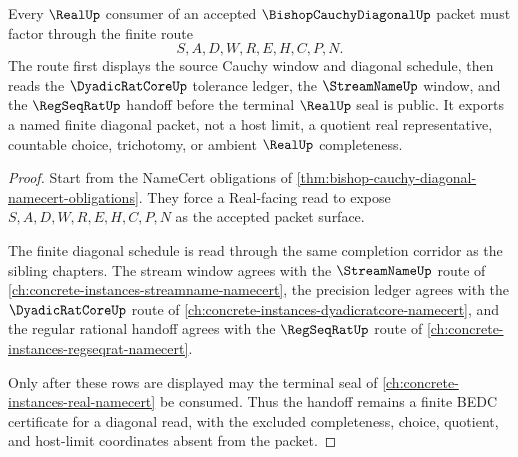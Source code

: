 \begin{theorem}
\label{thm:bishop-cauchy-diagonal-real-handoff}
Every $\RealUp$ consumer of an accepted $\BishopCauchyDiagonalUp$ packet must factor through the finite route
$$
S,A,D,W,R,E,H,C,P,N .
$$
The route first displays the source Cauchy window and diagonal schedule, then reads the $\DyadicRatCoreUp$ tolerance ledger, the $\StreamNameUp$ window, and the $\RegSeqRatUp$ handoff before the terminal $\RealUp$ seal is public. It exports a named finite diagonal packet, not a host limit, a quotient real representative, countable choice, trichotomy, or ambient $\RealUp$ completeness.
\end{theorem}
\begin{proof}
Start from the NameCert obligations of \autoref{thm:bishop-cauchy-diagonal-namecert-obligations}. They force a Real-facing read to expose $S,A,D,W,R,E,H,C,P,N$ as the accepted packet surface.

The finite diagonal schedule is read through the same completion corridor as the sibling chapters. The stream window agrees with the $\StreamNameUp$ route of \autoref{ch:concrete-instances-streamname-namecert}, the precision ledger agrees with the $\DyadicRatCoreUp$ route of \autoref{ch:concrete-instances-dyadicratcore-namecert}, and the regular rational handoff agrees with the $\RegSeqRatUp$ route of \autoref{ch:concrete-instances-regseqrat-namecert}.

Only after these rows are displayed may the terminal seal of \autoref{ch:concrete-instances-real-namecert} be consumed. Thus the handoff remains a finite BEDC certificate for a diagonal read, with the excluded completeness, choice, quotient, and host-limit coordinates absent from the packet.
\end{proof}



